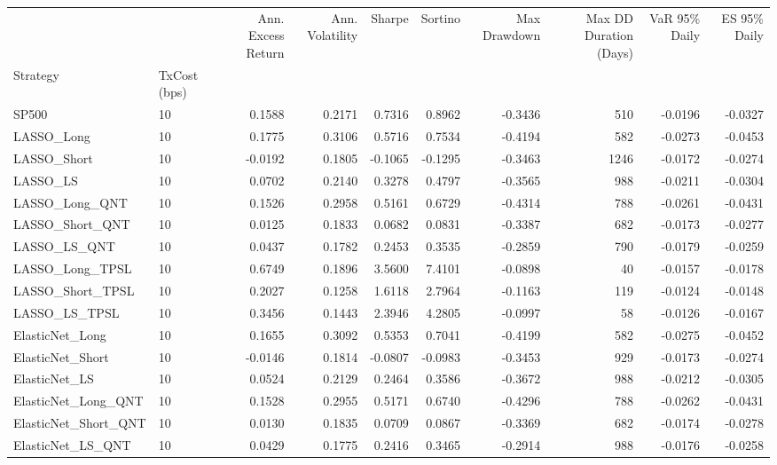\begin{tabular}{llrrrrrrrr}
\toprule
 &  & Ann. Excess Return & Ann. Volatility & Sharpe & Sortino & Max Drawdown & Max DD Duration (Days) & VaR 95\% Daily & ES 95\% Daily \\
Strategy & TxCost (bps) &  &  &  &  &  &  &  &  \\
\midrule
SP500 & 10 & 0.1588 & 0.2171 & 0.7316 & 0.8962 & -0.3436 & 510 & -0.0196 & -0.0327 \\
\cline{1-10}
LASSO\_Long & 10 & 0.1775 & 0.3106 & 0.5716 & 0.7534 & -0.4194 & 582 & -0.0273 & -0.0453 \\
\cline{1-10}
LASSO\_Short & 10 & -0.0192 & 0.1805 & -0.1065 & -0.1295 & -0.3463 & 1246 & -0.0172 & -0.0274 \\
\cline{1-10}
LASSO\_LS & 10 & 0.0702 & 0.2140 & 0.3278 & 0.4797 & -0.3565 & 988 & -0.0211 & -0.0304 \\
\cline{1-10}
LASSO\_Long\_QNT & 10 & 0.1526 & 0.2958 & 0.5161 & 0.6729 & -0.4314 & 788 & -0.0261 & -0.0431 \\
\cline{1-10}
LASSO\_Short\_QNT & 10 & 0.0125 & 0.1833 & 0.0682 & 0.0831 & -0.3387 & 682 & -0.0173 & -0.0277 \\
\cline{1-10}
LASSO\_LS\_QNT & 10 & 0.0437 & 0.1782 & 0.2453 & 0.3535 & -0.2859 & 790 & -0.0179 & -0.0259 \\
\cline{1-10}
LASSO\_Long\_TPSL & 10 & 0.6749 & 0.1896 & 3.5600 & 7.4101 & -0.0898 & 40 & -0.0157 & -0.0178 \\
\cline{1-10}
LASSO\_Short\_TPSL & 10 & 0.2027 & 0.1258 & 1.6118 & 2.7964 & -0.1163 & 119 & -0.0124 & -0.0148 \\
\cline{1-10}
LASSO\_LS\_TPSL & 10 & 0.3456 & 0.1443 & 2.3946 & 4.2805 & -0.0997 & 58 & -0.0126 & -0.0167 \\
\cline{1-10}
ElasticNet\_Long & 10 & 0.1655 & 0.3092 & 0.5353 & 0.7041 & -0.4199 & 582 & -0.0275 & -0.0452 \\
\cline{1-10}
ElasticNet\_Short & 10 & -0.0146 & 0.1814 & -0.0807 & -0.0983 & -0.3453 & 929 & -0.0173 & -0.0274 \\
\cline{1-10}
ElasticNet\_LS & 10 & 0.0524 & 0.2129 & 0.2464 & 0.3586 & -0.3672 & 988 & -0.0212 & -0.0305 \\
\cline{1-10}
ElasticNet\_Long\_QNT & 10 & 0.1528 & 0.2955 & 0.5171 & 0.6740 & -0.4296 & 788 & -0.0262 & -0.0431 \\
\cline{1-10}
ElasticNet\_Short\_QNT & 10 & 0.0130 & 0.1835 & 0.0709 & 0.0867 & -0.3369 & 682 & -0.0174 & -0.0278 \\
\cline{1-10}
ElasticNet\_LS\_QNT & 10 & 0.0429 & 0.1775 & 0.2416 & 0.3465 & -0.2914 & 988 & -0.0176 & -0.0258 \\

\end{tabular}

